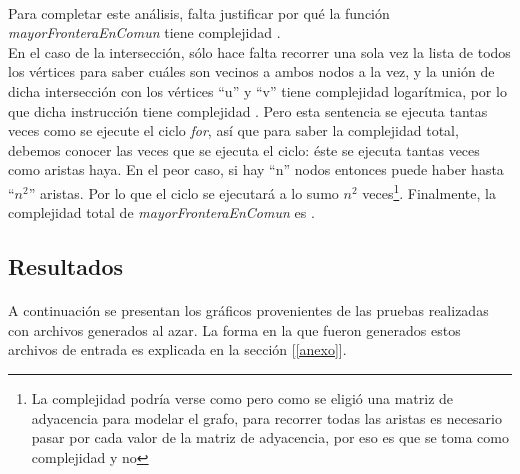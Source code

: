 \paragraph{}
Para completar este análisis, falta justificar por qué la función \textit{mayorFronteraEnComun} tiene complejidad .\\
En el caso de la intersección, sólo hace falta recorrer una sola vez la lista de todos los vértices para saber cuáles son vecinos a ambos nodos a la vez, y la unión de dicha intersección con los vértices ``u'' y ``v'' tiene complejidad logarítmica, por lo que dicha instrucción tiene complejidad . Pero esta sentencia se ejecuta tantas veces como se ejecute el ciclo \textit{for}, así que para saber la complejidad total, debemos conocer las veces que se ejecuta el ciclo: éste se ejecuta tantas veces como aristas haya. En el peor caso, si hay ``n'' nodos entonces puede haber hasta ``$n^2$'' aristas. Por lo que el ciclo se ejecutará a lo sumo $n^2$ veces\footnote{La complejidad podría verse como  pero como se eligió una matriz de adyacencia para modelar el grafo, para recorrer todas las aristas es necesario pasar por cada valor de la matriz de adyacencia, por eso es que se toma como complejidad  y no }. Finalmente, la complejidad total de \textit{mayorFronteraEnComun} es . 


\subsection{Resultados}

\paragraph{}
A continuación se presentan los gráficos provenientes de las pruebas realizadas con archivos generados al azar. La forma en la que fueron generados estos archivos de entrada es explicada en la sección [\ref{anexo}].


